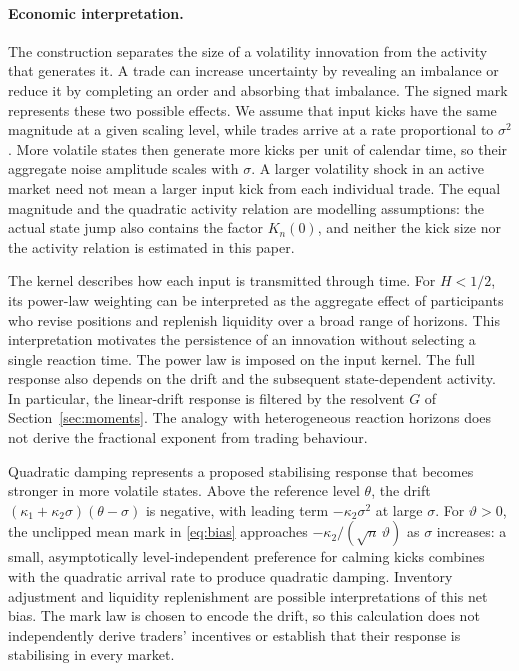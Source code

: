 \documentclass[11pt,a4paper]{article}
\theoremstyle{definition}
\begin{document}
\paragraph{Economic interpretation.}
The construction separates the size of a volatility innovation from the activity that generates it. A trade can increase uncertainty by revealing an imbalance or reduce it by completing an order and absorbing that imbalance. The signed mark represents these two possible effects. We assume that input kicks have the same magnitude at a given scaling level, while trades arrive at a rate proportional to $\sigma^2$. More volatile states then generate more kicks per unit of calendar time, so their aggregate noise amplitude scales with $\sigma$. A larger volatility shock in an active market need not mean a larger input kick from each individual trade. The equal magnitude and the quadratic activity relation are modelling assumptions: the actual state jump also contains the factor $K_n(0)$, and neither the kick size nor the activity relation is estimated in this paper.

The kernel describes how each input is transmitted through time. For $H<1/2$, its power-law weighting can be interpreted as the aggregate effect of participants who revise positions and replenish liquidity over a broad range of horizons. This interpretation motivates the persistence of an innovation without selecting a single reaction time. The power law is imposed on the input kernel. The full response also depends on the drift and the subsequent state-dependent activity. In particular, the linear-drift response is filtered by the resolvent $G$ of Section~\ref{sec:moments}. The analogy with heterogeneous reaction horizons does not derive the fractional exponent from trading behaviour.

Quadratic damping represents a proposed stabilising response that becomes stronger in more volatile states. Above the reference level $\theta$, the drift $(\kappa_1+\kappa_2\sigma)(\theta-\sigma)$ is negative, with leading term $-\kappa_2\sigma^2$ at large $\sigma$. For $\vartheta>0$, the unclipped mean mark in \eqref{eq:bias} approaches $-\kappa_2/(\sqrt n\,\vartheta)$ as $\sigma$ increases: a small, asymptotically level-independent preference for calming kicks combines with the quadratic arrival rate to produce quadratic damping. Inventory adjustment and liquidity replenishment are possible interpretations of this net bias. The mark law is chosen to encode the drift, so this calculation does not independently derive traders' incentives or establish that their response is stabilising in every market.
\end{document}
